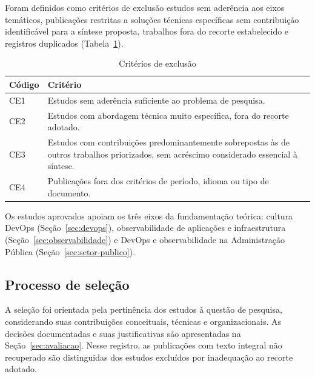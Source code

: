 Foram definidos como critérios de exclusão estudos sem aderência aos eixos
temáticos, publicações restritas a soluções técnicas específicas sem
contribuição identificável para a síntese proposta, trabalhos fora do
recorte estabelecido e registros duplicados (Tabela~\ref{tab:exclusao}).

\begin{table}[htbp]
\centering
\caption{Critérios de exclusão}\label{tab:exclusao}
\footnotesize
\begin{tabularx}{\linewidth}{@{}lX@{}}
\toprule
\textbf{Código} & \textbf{Critério} \\
\midrule
CE1 & Estudos sem aderência suficiente ao problema de pesquisa. \\
CE2 & Estudos com abordagem técnica muito específica, fora do recorte
      adotado. \\
CE3 & Estudos com contribuições predominantemente sobrepostas às de outros
      trabalhos priorizados, sem acréscimo considerado essencial à síntese. \\
CE4 & Publicações fora dos critérios de período, idioma ou tipo de
      documento. \\
\bottomrule
\end{tabularx}
\end{table}

Os estudos aprovados apoiam os três eixos da fundamentação teórica:
cultura DevOps (Seção~\ref{sec:devops}), observabilidade de aplicações e
infraestrutura (Seção~\ref{sec:observabilidade}) e DevOps e observabilidade
na Administração Pública (Seção~\ref{sec:setor-publico}).

\subsection{Processo de seleção}\label{sec:processo-selecao}

A seleção foi orientada pela pertinência dos estudos à questão de pesquisa,
considerando suas contribuições conceituais, técnicas e organizacionais. As decisões documentadas
e suas justificativas são apresentadas na Seção~\ref{sec:avaliacao}.
Nesse registro, as publicações com texto integral não recuperado são
distinguidas dos estudos excluídos por inadequação ao recorte adotado.


